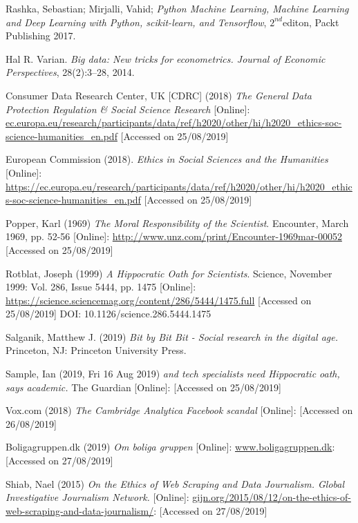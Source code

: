 \documentclass[12pt,a4paper]{article}
\begin{document}
Rashka, Sebastian; Mirjalli, Vahid; \textit{Python Machine Learning, Machine Learning and Deep Learning with Python, scikit-learn, and Tensorflow}, $2^{nd}$editon, Packt Publishing 2017.


Hal R. Varian. \textit{Big data: New tricks for econometrics. Journal of Economic Perspectives}, 28(2):3–28, 2014. 

Consumer Data Research Center, UK  [CDRC] (2018) \textit{The General Data Protection Regulation \& Social Science Research} [Online]: \href{https://ec.europa.eu/research/participants/data/ref/h2020/other/hi/h2020_ethics-soc-science-humanities_en.pdf}{ec.europa.eu/research/participants/data/ref/h2020/other/hi/h2020\_ethics-soc-science-humanities\_en.pdf} [Accessed on 25/08/2019]

European Commission (2018). \textit{Ethics in Social Sciences and the Humanities} [Online]: \href{https://ec.europa.eu/research/participants/data/ref/h2020/other/hi/h2020_ethics-soc-science-humanities_en.pdf}{https://ec.europa.eu/research/participants/data/ref/h2020/other/hi/h2020\_ethics-soc-science-humanities\_en.pdf} [Accessed on 25/08/2019] 

Popper, Karl (1969) \textit{The Moral Responsibility of the Scientist}. Encounter, March 1969, pp. 52-56 [Online]: \href{http://www.unz.com/print/Encounter-1969mar-00052}{http://www.unz.com/print/Encounter-1969mar-00052} [Accessed on 25/08/2019]

Rotblat, Joseph (1999) \textit{A Hippocratic Oath for Scientists}. Science, November 1999: Vol. 286, Issue 5444, pp. 1475 [Online]: \href{https://science.sciencemag.org/content/286/5444/1475.full}{https://science.sciencemag.org/content/286/5444/1475.full} [Accessed on 25/08/2019] DOI: 10.1126/science.286.5444.1475 

Salganik, Matthew J. (2019) \textit{Bit by Bit Bit - Social research in the digital age.} Princeton, NJ: Princeton University Press.

Sample, Ian (2019, Fri 16 Aug 2019) \textit{and tech specialists need Hippocratic oath, says academic.} The Guardian [Online]: \href{https://www.theguardian.com/science/2019/aug/16/mathematicians-need-doctor-style-hippocratic-oath-says-academic-hannah-fry} [Accessed on 25/08/2019]

Vox.com (2018) \textit{The Cambridge Analytica Facebook scandal} [Online]: \href{https://www.vox.com/2018/4/10/17207394/cambridge-analytica-facebook-zuckerberg-trump-privacy-scandal} [Accessed on 26/08/2019] 

Boligagruppen.dk (2019) \textit{Om boliga gruppen} [Online]: \href{https://www.boligagruppen.dk}{www.boligagruppen.dk}: [Accessed on 27/08/2019]

Shiab, Nael (2015) \textit{On the Ethics of Web Scraping and Data Journalism. Global Investigative Journalism Network.} [Online]: \href{https://gijn.org/2015/08/12/on-the-ethics-of-web-scraping-and-data-journalism/}{gijn.org/2015/08/12/on-the-ethics-of-web-scraping-and-data-journalism/}: [Accessed on 27/08/2019]
\end{document}
